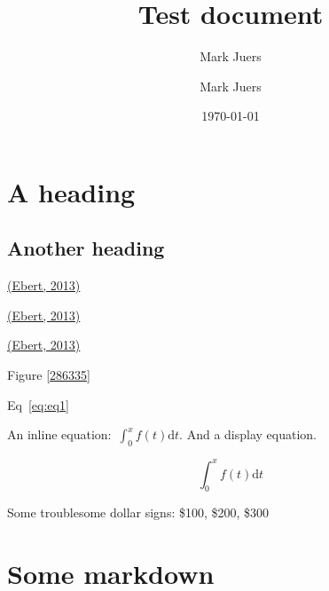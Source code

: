 \documentclass[10pt]{article}
\author[1]{Mark Juers}
\affil[1]{Indiana University}
\begin{document}
\title{Test document}



\author[1]{Mark Juers}%
%


\vspace{-1em}



  \date{\today}


\begingroup
\let\center\flushleft
\let\endcenter\endflushleft
\maketitle
\endgroup









\section*{A heading}

{\label{850151}}

\subsection*{Another heading}

{\label{367935}}

\hyperref[csl:1]{(Ebert, 2013)}

\hyperref[csl:1]{(Ebert, 2013)}

\hyperref[csl:1]{(Ebert, 2013)}

Figure {\ref{286335}}

Eq~{\ref{eq:eq1}}

An inline equation:~\(\int_0^xf\left(t\right)\mathrm{d}t\). And a display equation.

\begin{equation}
\label{eq:eq1}
\int_0^x f(t) \mathrm{d}t
\end{equation}

Some troublesome dollar signs: \$100, \$200, \$300

\section*{Some markdown}\label{some-markdown}
\end{document}
